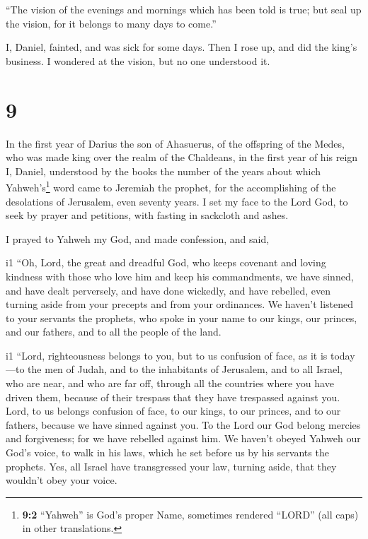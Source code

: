  ``The vision of the evenings and mornings which has been
told is true; but seal up the vision, for it belongs to many days to
come.''

 I, Daniel, fainted, and was sick for some days. Then I
rose up, and did the king's business. I wondered at the vision, but no
one understood it.

\hypertarget{section-8}{%
\section{9}\label{section-8}}

 In the first year of Darius the son of Ahasuerus, of the
offspring of the Medes, who was made king over the realm of the
Chaldeans,  in the first year of his reign I, Daniel,
understood by the books the number of the years about which
Yahweh's\footnote{\textbf{9:2} ``Yahweh'' is God's proper Name,
  sometimes rendered ``LORD'' (all caps) in other translations.} word
came to Jeremiah the prophet, for the accomplishing of the desolations
of Jerusalem, even seventy years.  I set my face to the
Lord God, to seek by prayer and petitions, with fasting in sackcloth and
ashes.

 I prayed to Yahweh my God, and made confession, and said,

i1 ``Oh, Lord, the great and dreadful God, who keeps covenant and loving
kindness with those who love him and keep his commandments,
 we have sinned, and have dealt perversely, and have done
wickedly, and have rebelled, even turning aside from your precepts and
from your ordinances.  We haven't listened to your
servants the prophets, who spoke in your name to our kings, our princes,
and our fathers, and to all the people of the land.

i1 ``Lord, righteousness belongs to you, but to us
confusion of face, as it is today---to the men of Judah, and to the
inhabitants of Jerusalem, and to all Israel, who are near, and who are
far off, through all the countries where you have driven them, because
of their trespass that they have trespassed against you. 
Lord, to us belongs confusion of face, to our kings, to our princes, and
to our fathers, because we have sinned against you.  To
the Lord our God belong mercies and forgiveness; for we have rebelled
against him.  We haven't obeyed Yahweh our God's voice,
to walk in his laws, which he set before us by his servants the
prophets.  Yes, all Israel have transgressed your law,
turning aside, that they wouldn't obey your voice.

